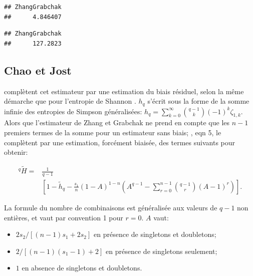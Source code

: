 \documentclass[
  11pt,
  french,
  a4paper,
  extrafontsizes,onecolumn,openright
  ]{memoir}
\newenvironment{Shaded}{\begin{snugshade}}{\end{snugshade}}
\newcommand{\DataTypeTok}[1]{\textcolor[rgb]{0.13,0.29,0.53}{#1}}
\newcommand{\DecValTok}[1]{\textcolor[rgb]{0.00,0.00,0.81}{#1}}
\newcommand{\KeywordTok}[1]{\textcolor[rgb]{0.13,0.29,0.53}{\textbf{#1}}}
\newcommand{\NormalTok}[1]{#1}
\newcommand{\OperatorTok}[1]{\textcolor[rgb]{0.81,0.36,0.00}{\textbf{#1}}}
\newcommand{\StringTok}[1]{\textcolor[rgb]{0.31,0.60,0.02}{#1}}
\providecommand{\tightlist}{%
  \setlength{\itemsep}{0pt}\setlength{\parskip}{0pt}}
\begin{document}
\begin{verbatim}
## ZhangGrabchak 
##      4.846407
\end{verbatim}

\begin{Shaded}
\end{Shaded}

\begin{verbatim}
## ZhangGrabchak 
##      127.2823
\end{verbatim}

\normalsize

\hypertarget{sec:BiaisHCDT}{%
\subsection{Chao et Jost}\label{sec:BiaisHCDT}}

\textcite{Chao2015} complètent cet estimateur par une estimation du biais résiduel, selon la même démarche que pour l'entropie de Shannon \autocite{Chao2013}.
\(h_q\) s'écrit sous la forme de la somme infinie des entropies de Simpson généralisées: \(h_q = \sum_{k=0}^{\infty}{\binom{q-1}{k}(-1)^k\zeta_{1,k}}\).
Alors que l'estimateur de Zhang et Grabchak ne prend en compte que les \(n-1\) premiers termes de la somme pour un estimateur sans biais; \textcite{Chao2015}, eqn 5, le complètent par une estimation, forcément biaisée, des termes suivants pour obtenir:

\begin{align}
  \label{eq:HqChaoJost}
  ^q\!{\tilde{H}} = 
  &\frac{1}{q-1} \\
  &\left[ 1 -\tilde{h}_q -\frac{s_{1}}{n} {\left( 1-A \right)}^{1-n} \left( A^{q-1} -\sum^{n-1}_{r=0}{ \binom{q-1}{r} {\left(A-1\right)}^r} \right) \right].
\end{align}

La formule du nombre de combinaisons est généralisée aux valeurs de \(q-1\) non entières, et vaut par convention 1 pour \(r=0\). \(A\) vaut:

\begin{itemize}
\tightlist
\item
  \(2s_{2}/{\left[\left(n-1\right) s_{1} +2s_{2}\right]}\) en présence de singletons et doubletons;
\item
  \(2/{\left[\left(n-1\right)\left(s_{1} -1\right)+2\right]}\) en présence de singletons seulement;
\item
  \(1\) en absence de singletons et doubletons.
\end{itemize}
\end{document}
